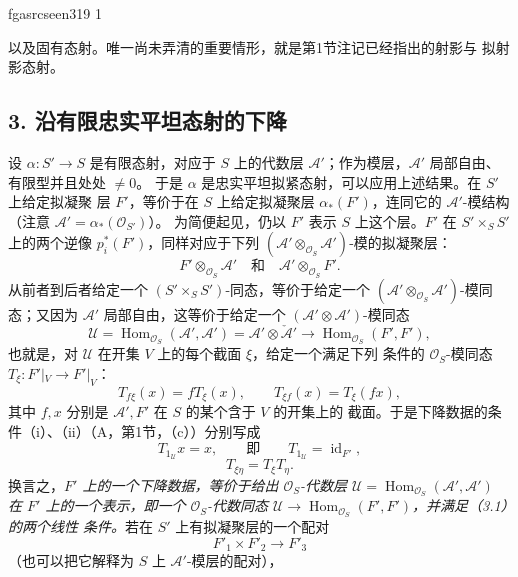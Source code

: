 \documentclass[12pt,twoside,openany]{book}
\numberwithin{equation}{section}
\newcommand{\fgaunitid}{unbound}
\newcommand{\src}[1]{%
  \phantomsection
  \hypertarget{src:\fgaunitid:#1}{}%
  \hypertarget{fga.\fgaunitid.p#1}{}%
  \ifcsname fgasrcseen#1\endcsname\else
    \expandafter\gdef\csname fgasrcseen#1\endcsname{1}%
    \hypertarget{src:#1}{}%
  \fi
  \marginpar{\raggedleft\footnotesize\sffamily #1}%
}
\theoremstyle{plain}
\theoremstyle{definition}
\theoremstyle{remark}
\begin{document}
\src{319}
以及固有态射。唯一尚未弄清的重要情形，就是第1节注记已经指出的射影与
拟射影态射。

\subsection*{3. 沿有限忠实平坦态射的下降}

设 $\alpha:S'\longrightarrow S$ 是有限态射，对应于 $S$ 上的代数层
$\mathcal A'$；作为模层，$\mathcal A'$ 局部自由、有限型并且处处 $\ne0$。
于是 $\alpha$ 是忠实平坦拟紧态射，可以应用上述结果。在 $S'$ 上给定拟凝聚
层 $F'$，等价于在 $S$ 上给定拟凝聚层 $\alpha_*(F')$，连同它的
$\mathcal A'$-模结构（注意 $\mathcal A'=\alpha_*(\mathcal O_{S'})$）。
为简便起见，仍以 $F'$ 表示 $S$ 上这个层。$F'$ 在
$S'\times_SS'$ 上的两个逆像 $p_i^*(F')$，同样对应于下列
$(\mathcal A'\otimes_{\mathcal O_S}\mathcal A')$-模的拟凝聚层：
\[
  F'\otimes_{\mathcal O_S}\mathcal A'
  \quad\text{和}\quad
  \mathcal A'\otimes_{\mathcal O_S}F'.
\]
从前者到后者给定一个 $(S'\times_SS')$-同态，等价于给定一个
$(\mathcal A'\otimes_{\mathcal O_S}\mathcal A')$-模同态；又因为
$\mathcal A'$ 局部自由，这等价于给定一个
$(\mathcal A'\otimes\mathcal A')$-模同态
\[
  \mathcal U=
  \operatorname{Hom}_{\mathcal O_S}(\mathcal A',\mathcal A')
  =\mathcal A'\otimes\check{\mathcal A}'
  \longrightarrow
  \operatorname{Hom}_{\mathcal O_S}(F',F'),
\]
也就是，对 $\mathcal U$ 在开集 $V$ 上的每个截面 $\xi$，给定一个满足下列
条件的 $\mathcal O_S$-模同态
$T_\xi:F'|_V\longrightarrow F'|_V$：
\begin{equation}
  T_{f\xi}(x)=fT_\xi(x),
  \qquad T_{\xi f}(x)=T_\xi(fx),
  \tag{3.1}
\end{equation}
其中 $f,x$ 分别是 $\mathcal A',F'$ 在 $S$ 的某个含于 $V$ 的开集上的
截面。于是下降数据的条件（i）、（ii）（A，第1节，（c））分别写成
\begin{equation}
  T_{1_{\mathcal U}}x=x,
  \qquad\text{即}\qquad
  T_{1_{\mathcal U}}=\operatorname{id}_{F'},
  \tag{3.2}
\end{equation}
\begin{equation}
  T_{\xi\eta}=T_\xi T_\eta.
  \tag{3.3}
\end{equation}
换言之，\emph{$F'$ 上的一个下降数据，等价于给出 $\mathcal O_S$-代数层
$\mathcal U=\operatorname{Hom}_{\mathcal O_S}(\mathcal A',\mathcal A')$
在 $F'$ 上的一个表示，即一个 $\mathcal O_S$-代数同态
$\mathcal U\longrightarrow\operatorname{Hom}_{\mathcal O_S}(F',F')$，并满足（3.1）的两个线性
条件。}若在 $S'$ 上有拟凝聚层的一个配对
\[
  F'_1\times F'_2\longrightarrow F'_3
\]
（也可以把它解释为 $S$ 上 $\mathcal A'$-模层的配对），
\end{document}
